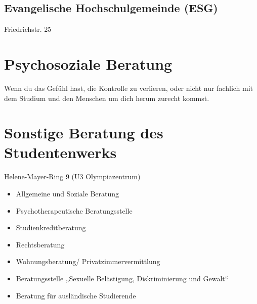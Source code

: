\subsection*{Evangelische Hochschulgemeinde (ESG)}
Friedrichstr. 25

\begin{urlList}
\end{urlList}

\section{Psychosoziale Beratung}

Wenn du das Gefühl hast, die Kontrolle zu verlieren, oder nicht nur fachlich mit
dem Studium und den Menschen um dich herum zurecht kommst.

\begin{urlList}
\end{urlList}


\section{Sonstige Beratung des Studentenwerks}
Helene-Mayer-Ring 9 (U3 Olympiazentrum)

\begin{itemize}
	\item Allgemeine und Soziale Beratung
	\item Psychotherapeutische Beratungsstelle
	\item Studienkreditberatung
	\item Rechtsberatung
	\item Wohnungsberatung/ Privatzimmervermittlung
	\item Beratungsstelle „Sexuelle Belästigung, Diskriminierung und Gewalt“
	\item Beratung für ausländische Studierende
\end{itemize}

\begin{urlList}
\end{urlList}

